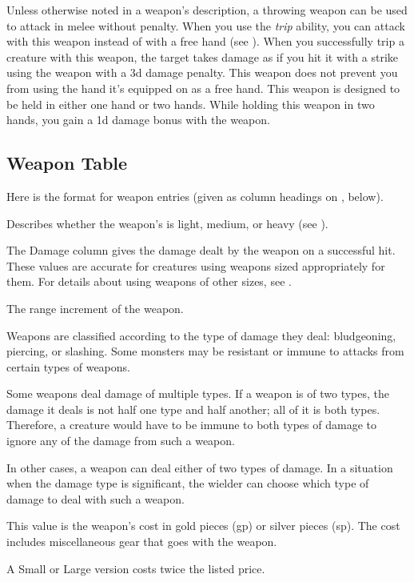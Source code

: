             Unless otherwise noted in a weapon's description, a throwing weapon can be used to attack in melee without penalty.
             When you use the \textit{trip} ability, you can attack with this weapon instead of with a free hand (see ).
            When you successfully trip a creature with this weapon, the target takes damage as if you hit it with a strike using the weapon with a \minus3d damage penalty.
             This weapon does not prevent you from using the hand it's equipped on as a free hand.
             This weapon is designed to be held in either one hand or two hands.
            While holding this weapon in two hands, you gain a \plus1d damage bonus with the weapon.

    \subsection{Weapon Table}
        Here is the format for weapon entries (given as column headings on , below).

         Describes whether the weapon's  is light, medium, or heavy (see ).

         The Damage column gives the damage dealt by the weapon on a successful hit.
        These values are accurate for creatures using weapons sized appropriately for them.
        For details about using weapons of other sizes, see .

         The range increment of the weapon.

         Weapons are classified according to the type of damage they deal: bludgeoning, piercing, or slashing. Some monsters may be resistant or immune to attacks from certain types of weapons.

        Some weapons deal damage of multiple types. If a weapon is of two types, the damage it deals is not half one type and half another; all of it is both types. Therefore, a creature would have to be immune to both types of damage to ignore any of the damage from such a weapon.

        In other cases, a weapon can deal either of two types of damage. In a situation when the damage type is significant, the wielder can choose which type of damage to deal with such a weapon.

         This value is the weapon's cost in gold pieces (gp) or silver pieces (sp). The cost includes miscellaneous gear that goes with the weapon.
        \par A Small or Large version costs twice the listed price.

